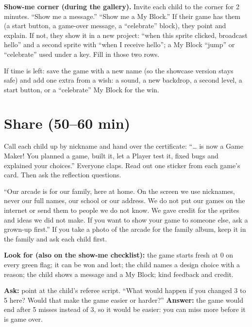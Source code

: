 \textbf{Show-me corner (during the gallery).} Invite each child to the corner for 2 minutes. \enquote{Show me a message.} \enquote{Show me a My Block.} If their game has them (a start button, a game-over message, a \enquote{celebrate} block), they point and explain. If not, they show it in a new project: \enquote{when this sprite clicked, broadcast hello} and a second sprite with \enquote{when I receive hello}; a My Block \enquote{jump} or \enquote{celebrate} used under a key. Fill in those two rows.

\begin{freebuild}
If time is left: save the game with a new name (so the showcase version stays safe) and add one extra from a wish: a sound, a new backdrop, a second level, a start button, or a \enquote{celebrate} My Block for the win.
\end{freebuild}

\section{Share (50--60 min)}
\begin{teacherscript}
Call each child up by nickname and hand over the certificate: \enquote{\ldots{} is now a Game Maker! You planned a game, built it, let a Player test it, fixed bugs and explained your choices.} Everyone claps. Read out one sticker from each game's card. Then ask the reflection questions.
\end{teacherscript}

\begin{safety}
\enquote{Our arcade is for our family, here at home. On the screen we use nicknames, never our full names, our school or our address. We do not put our games on the internet or send them to people we do not know. We gave credit for the sprites and ideas we did not make. If you want to show your game to someone else, ask a grown-up first.} If you take a photo of the arcade for the family album, keep it in the family and ask each child first.
\end{safety}

\begin{formativecheck}
\textbf{Look for (also on the show-me checklist):} the game starts fresh at 0 on every green flag; it can be won and lost; the child names a design choice with a reason; the child shows a message and a My Block; kind feedback and credit.

\textbf{Ask:} point at the child's referee script. \enquote{What would happen if you changed 3 to 5 here? Would that make the game easier or harder?}
\textbf{Answer:} the game would end after 5 misses instead of 3, so it would be easier: you can miss more before it is game over.
\end{formativecheck}

